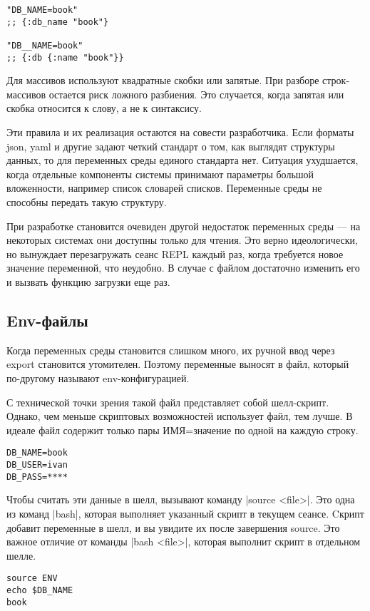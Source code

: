 \begin{verbatim}
"DB_NAME=book"
;; {:db_name "book"}

"DB__NAME=book"
;; {:db {:name "book"}}
\end{verbatim}

Для массивов используют квадратные скобки или запятые. При разборе
строк-массивов остается риск ложного разбиения. Это случается, когда запятая или
скобка относится к слову, а не к синтаксису.

Эти правила и их реализация остаются на совести разработчика. Если форматы json,
yaml и другие задают четкий стандарт о том, как выглядят структуры данных, то
для переменных среды единого стандарта нет. Ситуация ухудшается, когда отдельные
компоненты системы принимают параметры большой вложенности, например список
словарей списков. Переменные среды не способны передать такую структуру.

При разработке становится очевиден другой недостаток переменных среды — на
некоторых системах они доступны только для чтения. Это верно идеологически, но
вынуждает перезагружать сеанс REPL каждый раз, когда требуется новое значение
переменной, что неудобно. В случае с файлом достаточно изменить его и вызвать
функцию загрузки еще раз.

\subsection{Env-файлы}

Когда переменных среды становится слишком много, их ручной ввод через export
становится утомителен. Поэтому переменные выносят в файл, который по-другому
называют env-конфигурацией.

С технической точки зрения такой файл представляет собой шелл-скрипт. Однако,
чем меньше скриптовых возможностей использует файл, тем лучше. В идеале файл
содержит только пары ИМЯ=значение по одной на каждую строку.

\begin{verbatim}
DB_NAME=book
DB_USER=ivan
DB_PASS=****
\end{verbatim}

Чтобы считать эти данные в шелл, вызывают команду \spverb|source <file>|. Это одна из
команд \spverb|bash|, которая выполняет указанный скрипт в текущем сеансе. Cкрипт
добавит переменные в шелл, и вы увидите их после завершения source. Это важное
отличие от команды \spverb|bash <file>|, которая выполнит скрипт в отдельном шелле.

\begin{verbatim}
source ENV
echo $DB_NAME
book
\end{verbatim}

